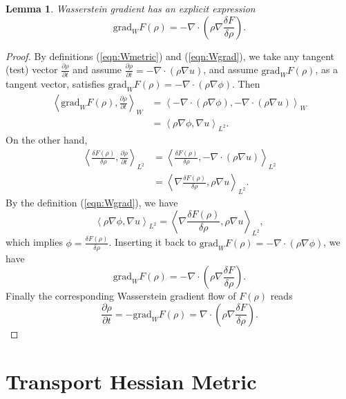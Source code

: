 \documentclass[11pt]{book}
\newtheorem{lemma}[theorem]{Lemma}
\begin{document}
\begin{lemma}
Wasserstein gradient has an explicit expression
\[
\mathrm{grad}_W F(\rho) = -\nabla \cdot \left(  \rho \nabla \frac{\delta F}{\delta \rho}  \right).
\]
\end{lemma}
\begin{proof}
By definitions (\ref{eqn:Wmetric}) and (\ref{eqn:Wgrad}), we take any tangent (test) vector $\frac{\partial\rho}{\partial t}$ and assume $\frac{\partial\rho}{\partial t} = -\nabla\cdot(\rho\nabla u)$, and assume $\text{grad}_W F(\rho)$, as a tangent vector, satisfies $\text{grad}_W F(\rho) = -\nabla\cdot(\rho\nabla \phi)$. Then
\begin{align*}
\left\langle \text{grad}_W F(\rho), \frac{\partial\rho}{\partial t} \right\rangle_W 
& = \left\langle -\nabla\cdot(\rho\nabla \phi), -\nabla\cdot(\rho\nabla u)\right\rangle_W \\
& = \left\langle \rho \nabla \phi, \nabla u \right\rangle_{L^2}.
\end{align*}
On the other hand,
\begin{align*}
\left\langle \frac{\delta F(\rho)}{\delta \rho}, \frac{\partial\rho}{\partial t} \right\rangle_{L^2}
& = \left\langle  \frac{\delta F(\rho)}{\delta \rho}, -\nabla\cdot(\rho\nabla u)\right\rangle_{L^2} \\
& = \left\langle  \nabla \frac{\delta F(\rho)}{\delta \rho}, \rho\nabla u  \right\rangle_{L^2}.
\end{align*}
By the definition (\ref{eqn:Wgrad}), we have
\[
\left\langle \rho \nabla \phi, \nabla u \right\rangle_{L^2} = 
\left\langle  \nabla \frac{\delta F(\rho)}{\delta \rho}, \rho\nabla u  \right\rangle_{L^2},
\]
which implies
$
\phi = \frac{\delta F(\rho)}{\delta \rho}
$.
Inserting it back to $\text{grad}_W F(\rho) = -\nabla\cdot(\rho\nabla \phi)$, we have
\[
\text{grad}_W F(\rho) = -\nabla \cdot \left(  \rho \nabla \frac{\delta F}{\delta \rho}  \right).
\]
Finally the corresponding Wasserstein gradient flow of $F(\rho)$ reads
\[
\frac{\partial \rho}{\partial t} = - \text{grad}_W F(\rho) = \nabla \cdot \left(  \rho \nabla \frac{\delta F}{\delta \rho}  \right).
\]
\end{proof}











\section{Transport Hessian Metric}
\end{document}
